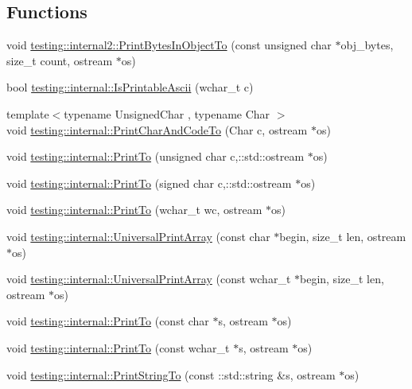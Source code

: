 \subsection*{Functions}
\begin{DoxyCompactItemize}
\item 
void \hyperlink{namespacetesting_1_1internal2_abfb9aa80365f93b952e9a4bea09947a8}{testing\-::internal2\-::\-Print\-Bytes\-In\-Object\-To} (const unsigned char $\ast$obj\-\_\-bytes, size\-\_\-t count, ostream $\ast$os)
\item 
bool \hyperlink{namespacetesting_1_1internal_a744a6dd74c12d1e2c16b3c03e14ed4d4}{testing\-::internal\-::\-Is\-Printable\-Ascii} (wchar\-\_\-t c)
\item 
{\footnotesize template$<$typename Unsigned\-Char , typename Char $>$ }\\void \hyperlink{namespacetesting_1_1internal_a0c577e598e61d339ba45dd6643fb1969}{testing\-::internal\-::\-Print\-Char\-And\-Code\-To} (Char c, ostream $\ast$os)
\item 
void \hyperlink{namespacetesting_1_1internal_abae1a8d465376b68576918205ad706a9}{testing\-::internal\-::\-Print\-To} (unsigned char c,\-::std\-::ostream $\ast$os)
\item 
void \hyperlink{namespacetesting_1_1internal_a09f551128c4d165c37004e36ccc87aa0}{testing\-::internal\-::\-Print\-To} (signed char c,\-::std\-::ostream $\ast$os)
\item 
void \hyperlink{namespacetesting_1_1internal_aa74ea9d64f76ce69eceb225ca5ebef58}{testing\-::internal\-::\-Print\-To} (wchar\-\_\-t wc, ostream $\ast$os)
\item 
void \hyperlink{namespacetesting_1_1internal_a070107e7a8205ad6ec4d538d52b15b38}{testing\-::internal\-::\-Universal\-Print\-Array} (const char $\ast$begin, size\-\_\-t len, ostream $\ast$os)
\item 
void \hyperlink{namespacetesting_1_1internal_a52394019018eb5079f9f1bcca23dcd60}{testing\-::internal\-::\-Universal\-Print\-Array} (const wchar\-\_\-t $\ast$begin, size\-\_\-t len, ostream $\ast$os)
\item 
void \hyperlink{namespacetesting_1_1internal_adc6c98306d40b53fd07be4e295102a0a}{testing\-::internal\-::\-Print\-To} (const char $\ast$s, ostream $\ast$os)
\item 
void \hyperlink{namespacetesting_1_1internal_afc20fb56b2547a8f91f9ff99650f2024}{testing\-::internal\-::\-Print\-To} (const wchar\-\_\-t $\ast$s, ostream $\ast$os)
\item 
void \hyperlink{namespacetesting_1_1internal_ad609167d8d6792b0fb186539e0e159bd}{testing\-::internal\-::\-Print\-String\-To} (const \-::std\-::string \&s, ostream $\ast$os)
\end{DoxyCompactItemize}
